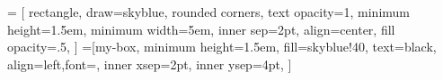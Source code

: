
\newcommand{\customfontsize}{\fontsize{6pt}{7pt}\selectfont}

= [
    rectangle,
    draw=skyblue,
    rounded corners,
    text opacity=1,
    minimum height=1.5em,
    minimum width=5em,
    inner sep=2pt,
    align=center,
    fill opacity=.5,
]
=[my-box, minimum height=1.5em,
    fill=skyblue!40, text=black, align=left,font=\customfontsize,
    inner xsep=2pt,
    inner ysep=4pt,
]
\begin{figure*}[h!]


\end{figure*}
